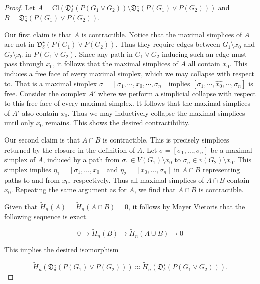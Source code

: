 \documentclass[pdflatex,bst/sn-mathphys-num]{sn-jnl}%
\theoremstyle{thmstyleone}%
\theoremstyle{definition}
\theoremstyle{thmstyletwo}%
\newcommand{\FD}{\mathfrak{D}}
\theoremstyle{thmstylethree}%
\begin{document}
\begin{proof}
    Let $A= \text{Cl}(\FD^\star_\delta(P(G_1\vee G_2))\setminus \FD^\star_\delta(P(G_1)\vee P(G_2)))$ and $B=\FD^\star_\delta(P(G_1)\vee P(G_2))$.

    Our first claim is that $A$ is contractible. Notice that the maximal simplices of $A$ are not in $\FD^\star_\delta(P(G_1)\vee P(G_2))$. Thus they require edges between $G_1\setminus x_0$ and $G_2\setminus x_0$ in $P(G_1\vee G_2)$. Since any path in $G_1\vee G_2$ inducing such an edge must pass through $x_0$, it follows that the maximal simplices of $A$ all contain $x_0$. This induces a free face of every maximal simplex, which we may collapse with respect to. That is a maximal simplex $\sigma=[\sigma_1,\cdots,x_0,\cdots,\sigma_n]$ implies $ [\sigma_1,\cdots,\hat{x_0},\cdots,\sigma_n]$ is free. Consider the complex $A'$ where we perform a simplicial collapse with respect to this free face of every maximal simplex. It follows that the maximal simplices of $A'$ also contain $x_0$. Thus we may inductively collapse the maximal simplices until only $x_0$ remains. This shows the desired contractibility.

    Our second claim is that $A\cap B$ is contractible. This is precisely simplices returned by the closure in the definition of $A$. Let $\sigma=[\sigma_1,\dotsc,\sigma_n]$ be a maximal simplex of $A$, induced by a path from $\sigma_1\in V(G_1)\setminus x_0$ to $\sigma_n\in v(G_2)\setminus x_0$. This simplex implies $\eta_1=[\sigma_1,\dotsc,x_0]$ and $\eta_2=[x_0,\dotsc,\sigma_n]$ in $A\cap B$ representing paths to and from $x_0$, respectively. Thus all maximal simplices of $A\cap B$ contain $x_0$. Repeating the same argument as for $A$, we find that $A\cap B$  is contractible.

    Given that $\tilde{H}_n(A)=\tilde{H}_n(A\cap B)=0$, it follows by Mayer Vietoris that the following sequence is exact.

    \[
    0
    \longrightarrow
    \tilde{H}_n(B)
    \longrightarrow
    \tilde{H}_n(A\cup B)
    \longrightarrow
    0
    \]

    This implies the desired isomorphism

    \[
    \tilde{H}_n(\FD^\star_\delta(P(G_1)\vee P(G_2)))
    \approx
    \tilde{H}_n(\FD^\star_\delta(P(G_1\vee G_2))).
    \]








\end{proof}
\end{document}
